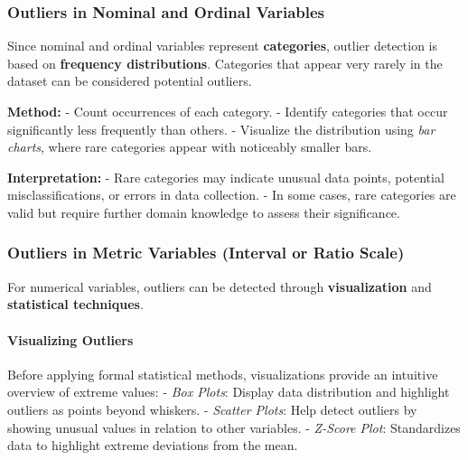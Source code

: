 \documentclass[12pt,openany]{book}
\begin{document}
\subsubsection{Outliers in Nominal and Ordinal Variables}

Since nominal and ordinal variables represent \textbf{categories}, outlier detection 
is based on \textbf{frequency distributions}. Categories that appear very rarely in 
the dataset can be considered potential outliers.
\newline

\textbf{Method:}  
\newline
- Count occurrences of each category.  
- Identify categories that occur significantly less frequently than others.  
- Visualize the distribution using \textit{bar charts}, where rare categories 
  appear with noticeably smaller bars.
\newline

\textbf{Interpretation:}  
\newline
- Rare categories may indicate unusual data points, potential misclassifications, 
  or errors in data collection.  
- In some cases, rare categories are valid but require further domain knowledge 
  to assess their significance.  
\newline

\subsubsection{Outliers in Metric Variables (Interval or Ratio Scale)}

For numerical variables, outliers can be detected through \textbf{visualization} 
and \textbf{statistical techniques}.
\newline

\paragraph{Visualizing Outliers}
Before applying formal statistical methods, visualizations provide an intuitive 
overview of extreme values:
\newline
- \textit{Box Plots}: Display data distribution and highlight outliers as 
  points beyond whiskers.
\newline
- \textit{Scatter Plots}: Help detect outliers by showing unusual values in 
  relation to other variables.
\newline
- \textit{Z-Score Plot}: Standardizes data to highlight extreme deviations 
  from the mean.
\newline
\end{document}
